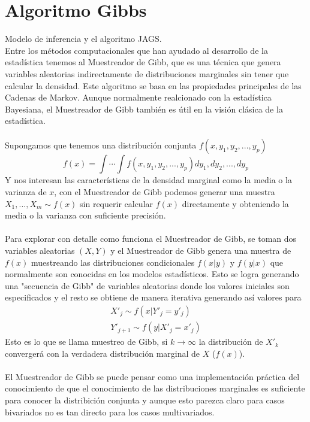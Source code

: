 \section{Algoritmo Gibbs}
Modelo de inferencia y el algoritmo JAGS.\\
Entre los m\'etodos computacionales que han ayudado al desarrollo de la estad\'istica tenemos al Muestreador de Gibb, que es una t\'ecnica que genera variables aleatorias indirectamente de distribuciones marginales sin tener que calcular la densidad. Este algoritmo se basa en las propiedades principales de las Cadenas de Markov. Aunque normalmente realcionado con la estad\'istica Bayesiana, el Muestreador de Gibb tambi\'en es \'util en la visi\'on cl\'asica de la estad\'istica.\\
\\
Supongamos que tenemos una distribuci\'on conjunta $f(x,y_1,y_2,...,y_p)$\\
\[f(x)=\int \cdots \int f(x,y_1,y_2,...,y_p) dy_1,dy_2,...,dy_p\]
Y nos interesan las caracter\'isticas de la densidad marginal como la media o la varianza de $x$, con el Muestreador de Gibb podemos generar una muestra $X_1,...,X_m \sim f(x)$ sin requerir calcular $f(x)$ directamente y obteniendo la media o la varianza con suficiente precisi\'on.\\
\\
Para explorar con detalle como funciona el Muestreador de Gibb, se toman dos variables aleatorias $(X,Y)$ y el Muestreador de Gibb genera una muestra de $f(x)$ muestreando las distribuciones condicionales $f(x|y)$ y $f(y|x)$ que normalmente son conocidas en los modelos estad\'isticos. Esto se logra generando una "secuencia de Gibb" de variables aleatorias donde los valores iniciales son especificados y el resto se obtiene de manera iterativa generando as\'i valores para\\
\begin{align*}
X'_j \sim f(x|Y'_j=y'_j)\\
Y'_{j+1} \sim f(y|X'_j=x'_j)
\end{align*}
Esto es lo que se llama muestreo de Gibb, si $k \rightarrow \infty$ la distribuci\'on de $X'_k$ converger\'a con la verdadera distribuci\'on marginal de $X$ ($f(x)$).\\
\\
El Muestreador de Gibb se puede pensar como una implementaci\'on pr\'actica del conocimiento de que el conocimiento de las distribuciones marginales es suficiente para conocer la distribici\'on conjunta y aunque esto parezca claro para casos bivariados no es tan directo para los casos multivariados.\\
